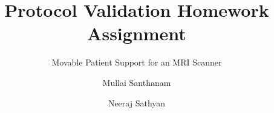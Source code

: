 \documentclass[runningheads]{llncs}
\begin{document}
%
\title{Protocol Validation Homework Assignment}
\subtitle{Movable Patient Support for an MRI Scanner}
%
%
\author{Mullai Santhanam \and
Neeraj Sathyan}
%
%
%
\maketitle              %
%








\end{document}
